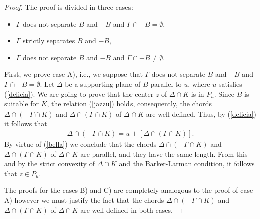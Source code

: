 \documentclass[12pt]{amsart}
\begin{document}
\begin{proof} 
                   The proof is divided in three cases:
    \begin{itemize}
        \item [A)] $\Gamma$ does not separate $B$ and $-B$ and 
                   $\Gamma \cap -B=\emptyset$,    
       \item [B)] $\Gamma$ strictly separates $B$ and
                    $-B$,
       \item [C)] $\Gamma$ does not separate $B$ and $-B$ and 
                   $\Gamma \cap -B\not=\emptyset$.
     \end{itemize}
                   First, we prove case A), i.e., we suppose that $\Gamma$ does not separate $B$ and 
                   $-B$ and $\Gamma \cap -B=\emptyset$. Let $\Delta$ be a supporting plane of $B$ 
                   parallel to $u$, where $u$ satisfies (\ref{delicia}). We are going to prove that the center 
                   $z$ of $\Delta \cap K$ is in $P_u$. Since $B$ is suitable for $K$, the relation (\ref{jazzu}) 
                   holds, consequently, the chords $\Delta \cap (-\Gamma \cap K)$ and 
                   $\Delta \cap (\Gamma \cap K)$ of $\Delta \cap K$ are well defined. Thus, by 
                   (\ref{delicia}) it follows that
\begin{eqnarray}\label{bella}
                   \Delta \cap (-\Gamma \cap K)=  u+[ \Delta \cap (\Gamma \cap K)].
\end{eqnarray}
                   By virtue of (\ref{bella}) we conclude that the chords 
                   $ \Delta \cap (-\Gamma \cap K)$ and $\Delta \cap (\Gamma \cap K)$ of 
                   $\Delta \cap K$ are parallel, and they have the same length. From this and by 
                   the strict convexity of $\Delta \cap K$ and the Barker-Larman condition, it follows that $z\in P_u$.
                   
                   The proofs for the cases B) and C) are completely analogous to the proof of case A) 
                   however we must justify the fact that the chords $\Delta \cap (-\Gamma \cap K)$ and 
                   $\Delta \cap (\Gamma \cap K)$ of $\Delta \cap K$ are well defined in both cases. 
                   

\end{proof}
\end{document}
